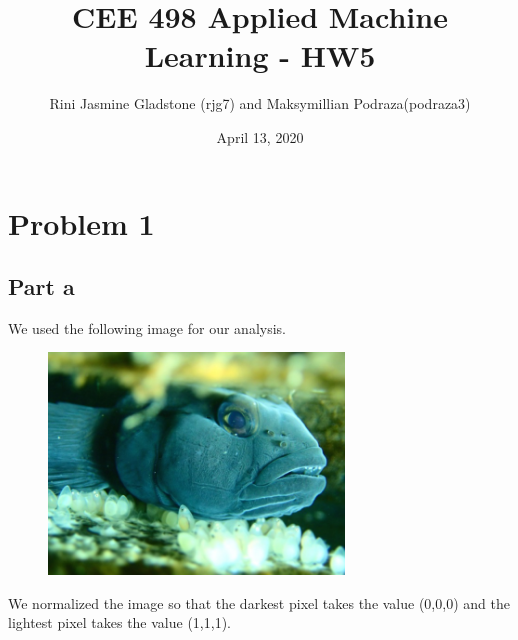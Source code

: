\documentclass{article}      %
\title{CEE 498 Applied Machine Learning - HW5}  %
\author{Rini Jasmine Gladstone (rjg7) and Maksymillian Podraza(podraza3)}      %
\date{April 13, 2020}      %
\begin{document}

\maketitle                   %


\section{Problem 1}      %

\subsection{Part a}

We used the following image for our analysis.

\begin{figure}[H]
\centering
\includegraphics[width=0.7\textwidth]{RobertMixed03.jpg}
\end{figure}

We normalized the image so that the darkest pixel takes the value (0,0,0) and the lightest pixel takes the value (1,1,1).
\end{document}
